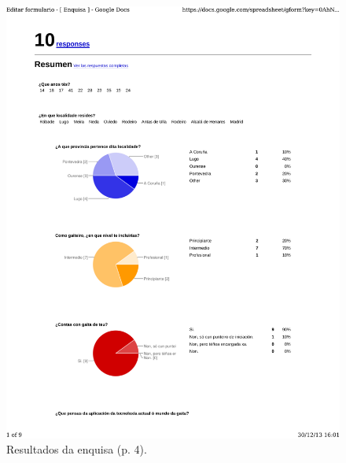 \begin{figure}
 \centering
 \includegraphics[scale=0.7,page=4,keepaspectratio=true,clip,trim=0cm 0.5cm 0cm 0.5cm]{./imagenes/enquisa.pdf}
 \caption{Resultados da enquisa (p. 4).}
 \label{figura:ResultadosEnquisa4}
\end{figure}

